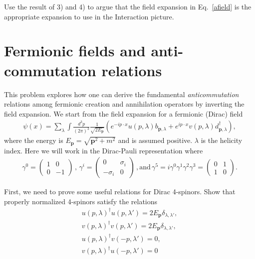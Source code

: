 \documentclass[working, oneside]{../../../Preambles/tuftebook}
\begin{document}
\begin{exercise}[5]
Use the result of 3) and 4) to argue that the field expansion 
in Eq.~\eqref{afield} is the appropriate expansion to use in the Interaction 
picture.


\section{Fermionic fields and anti-commutation relations}
\noindent This problem explores how one can derive the fundamental 
{\it anticommutation} relations among fermionic creation and annihilation
operators by inverting the field expansion. We start from the field 
expansion for a fermionic (Dirac) field
\begin{align}\label{dfield}
\psi(x)=\sum_\lambda\int \frac{d^3p}{(2\pi)^3}\frac{1}{\sqrt{2E_{\bm p}}}
\left(e^{-ip\cdot x}u(p,\lambda)b_{\bm p,\lambda}+e^{ip\cdot x}v(p,\lambda)d_{\bm p,\lambda}^{\dagger}\right),
\end{align}
where the energy is $E_{\bm p}=\sqrt{\bm p^2+m^2}$ and is assumed positive. $\lambda$ is 
the helicity index. Here we will work in the Dirac-Pauli representation where
\begin{align}
\gamma^0=\left(\begin{matrix}1 & 0 \\ 0 & -1\end{matrix}\right)\, ,\,
\gamma^i=\left(\begin{matrix}0 & \sigma_i \\ -\sigma_i & 0\end{matrix}\right)\, ,\textrm{and}\, 
\gamma^5=i\gamma^0\gamma^1\gamma^2\gamma^3=\left(\begin{matrix}0 & 1 \\ 1 & 0\end{matrix}\right).
\end{align}
\end{exercise}
\begin{exercise}[6]
First, we need to prove some useful relations for Dirac 4-spinors. Show
that properly normalized 4-spinors satisfy the relations
\begin{align}
&u(p,\lambda)^{\dagger}u(p,\lambda')=2E_{\bm p}\delta_{\lambda,\lambda'},&\\
&v(p,\lambda)^{\dagger}v(p,\lambda')=2E_{\bm p}\delta_{\lambda,\lambda'},&\\
&u(p,\lambda)^{\dagger}v(-p,\lambda')=0,&\\
&v(p,\lambda)^{\dagger}u(-p,\lambda')=0&
\end{align}
\end{exercise}
\end{document}
